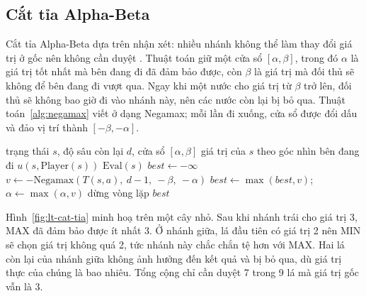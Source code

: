 \subsection{Cắt tỉa Alpha-Beta}
\label{sec:lt-alpha-beta}
Cắt tỉa Alpha-Beta dựa trên nhận xét: nhiều nhánh không thể làm thay đổi giá trị ở gốc nên không cần duyệt \cite{knuth1975alphabeta}. Thuật toán giữ một cửa sổ $[\alpha, \beta]$, trong đó $\alpha$ là giá trị tốt nhất mà bên đang đi đã đảm bảo được, còn $\beta$ là giá trị mà đối thủ sẽ không để bên đang đi vượt qua. Ngay khi một nước cho giá trị từ $\beta$ trở lên, đối thủ sẽ không bao giờ đi vào nhánh này, nên các nước còn lại bị bỏ qua. Thuật toán~\ref{alg:negamax} viết ở dạng Negamax; mỗi lần đi xuống, cửa sổ được đổi dấu và đảo vị trí thành $[-\beta, -\alpha]$.

\begin{algorithm}[!htb]
  \caption{Negamax với cắt tỉa Alpha-Beta}
  \label{alg:negamax}
  \begin{algorithmic}[1]
    \REQUIRE trạng thái $s$, độ sâu còn lại $d$, cửa sổ $[\alpha, \beta]$
    \ENSURE giá trị của $s$ theo góc nhìn bên đang đi
      \RETURN $u(s, \text{Player}(s))$
    \ENDIF
      \RETURN $\text{Eval}(s)$
    \ENDIF
    \STATE $\mathit{best} \leftarrow -\infty$
      \STATE $v \leftarrow -\text{Negamax}(T(s, a),\ d - 1,\ -\beta,\ -\alpha)$
      \STATE $\mathit{best} \leftarrow \max(\mathit{best}, v)$; \quad $\alpha \leftarrow \max(\alpha, v)$
      \IF{$\alpha \ge \beta$}
        \STATE dừng vòng lặp 
      \ENDIF
    \ENDFOR
    \RETURN $\mathit{best}$
  \end{algorithmic}
\end{algorithm}

Hình~\ref{fig:lt-cat-tia} minh hoạ trên một cây nhỏ. Sau khi nhánh trái cho giá trị 3, MAX đã đảm bảo được ít nhất 3. Ở nhánh giữa, lá đầu tiên có giá trị 2 nên MIN sẽ chọn giá trị không quá 2, tức nhánh này chắc chắn tệ hơn với MAX. Hai lá còn lại của nhánh giữa không ảnh hưởng đến kết quả và bị bỏ qua, dù giá trị thực của chúng là bao nhiêu. Tổng cộng chỉ cần duyệt 7 trong 9 lá mà giá trị gốc vẫn là 3.

